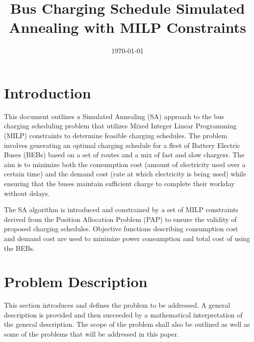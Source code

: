 \documentclass[11pt,a4paper,final]{article}
\date{\today}
\title{Bus Charging Schedule Simulated Annealing with MILP Constraints}
\begin{document}
\maketitle
\tableofcontents

\parskip 3mm                                %
\let\ref\autoref                            %

\section{Introduction}
\label{sec:introduction}
This document outlines a Simulated Annealing (SA) approach to the bus charging scheduling problem that utilizes Mixed
Integer Linear Programming (MILP) constraints to determine feasible charging schedules. The problem involves generating
an optimal charging schedule for a fleet of Battery Electric Buses (BEBs) based on a set of routes and a mix of fast and
slow chargers. The aim is to minimize both the consumption cost (amount of electricity used over a certain time) and the
demand cost (rate at which electricity is being used) while ensuring that the buses maintain sufficient charge to
complete their workday without delays.

The SA algorithm is introduced and constrained by a set of MILP constraints derived from the Position Allocation Problem
(PAP) to ensure the validity of proposed charging schedules. Objective functions describing consumption cost and demand
cost are used to minimize power consumption and total cost of using the BEBs.
\section{Problem Description}
\label{sec:problem-description}
This section introduces and defines the problem to be addressed. A general description is provided and then succeeded by
a mathematical interpretation of the general description. The scope of the problem shall also be outlined as well as
some of the problems that will be addressed in this paper.
\end{document}
